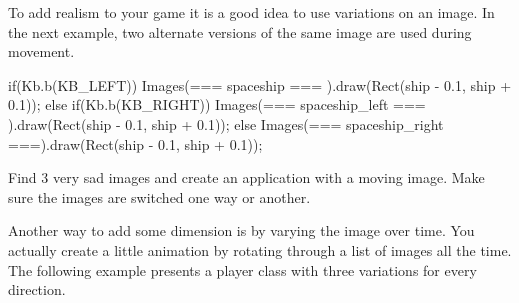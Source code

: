 To add realism to your game it is a good idea to use variations on an image. In the next example, two alternate versions of the same image are used during movement.

\begin{code}
if(Kb.b(KB_LEFT))
{
	Images(=== spaceship ===      ).draw(Rect(ship - 0.1,  ship + 0.1));
} else if(Kb.b(KB_RIGHT))
{
	Images(=== spaceship_left === ).draw(Rect(ship - 0.1,  ship + 0.1));
} else
{
	Images(=== spaceship_right ===).draw(Rect(ship - 0.1,  ship + 0.1));
}
\end{code}

\begin{exercise}
Find 3 very sad images and create an application with a moving image. Make sure the images are switched one way or another.
\end{exercise}

Another way to add some dimension is by varying the image over time. You actually create a little animation by rotating through a list of images all the time. The following example presents a player class with three variations for every direction.

